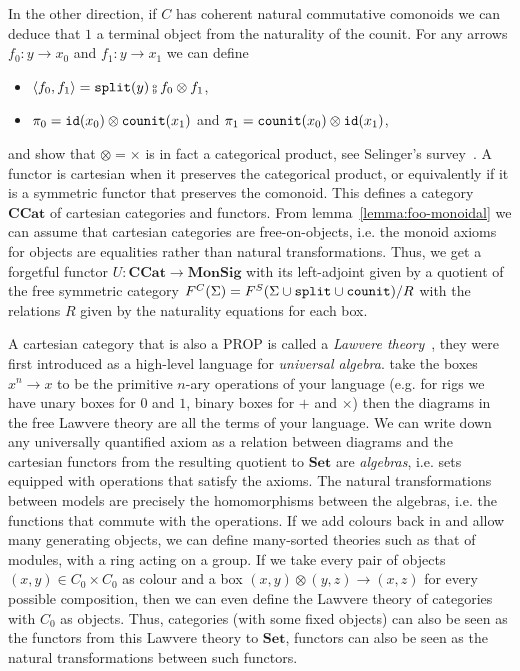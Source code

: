 In the other direction, if $C$ has coherent natural commutative comonoids we can deduce that $1$ a terminal object from the naturality of the counit.
For any arrows $f_0 : y \to x_0$ and $f_1 : y \to x_1$ we can define
\begin{itemize}
\item $\langle f_0, f_1 \rangle = \ttsplit(y) \fcmp f_0 \otimes f_1$,
\item $\pi_0 = \mathtt{id}(x_0) \otimes \mathtt{counit}(x_1)$ and $\pi_1 = \mathtt{counit}(x_0) \otimes \mathtt{id}(x_1)$,
\end{itemize}
and show that $\otimes = \times$ is in fact a categorical product, see Selinger's survey~\cite[Section 6.1]{Selinger10}.
A functor is cartesian when it preserves the categorical product, or equivalently if it is a symmetric functor that preserves the comonoid.
This defines a category $\mathbf{CCat}$ of cartesian categories and functors.
From lemma~\ref{lemma:foo-monoidal} we can assume that cartesian categories are free-on-objects, i.e. the monoid axioms for objects are equalities rather than natural transformations.
Thus, we get a forgetful functor $U : \mathbf{CCat} \to \mathbf{MonSig}$ with its left-adjoint given by a quotient of the free symmetric category $F^C(\Sigma) = F^S(\Sigma \cup \mathtt{split} \cup \mathtt{counit}) / R$ with the relations $R$ given by the naturality equations for each box.

A cartesian category that is also a PROP is called a \emph{Lawvere theory}~\cite{Lawvere63}, they were first introduced as a high-level language for \emph{universal algebra}. take the boxes $x^n \to x$ to be the primitive $n$-ary operations of your language (e.g. for rigs we have unary boxes for $0$ and $1$, binary boxes for $+$ and $\times$) then the diagrams in the free Lawvere theory are all the terms of your language.
We can write down any universally quantified axiom as a relation between diagrams and the cartesian functors from the resulting quotient to $\mathbf{Set}$ are \emph{algebras}, i.e. sets equipped with operations that satisfy the axioms.
The natural transformations between models are precisely the homomorphisms between the algebras, i.e. the functions that commute with the operations.
If we add colours back in and allow many generating objects, we can define many-sorted theories such as that of modules, with a ring acting on a group.
If we take every pair of objects $(x, y) \in C_0 \times C_0$ as colour and a box $(x, y) \otimes (y, z) \to (x, z)$ for every possible composition, then we can even define the Lawvere theory of categories with $C_0$ as objects.
Thus, categories (with some fixed objects) can also be seen as the functors from this Lawvere theory to $\mathbf{Set}$, functors can also be seen as the natural transformations between such functors.

